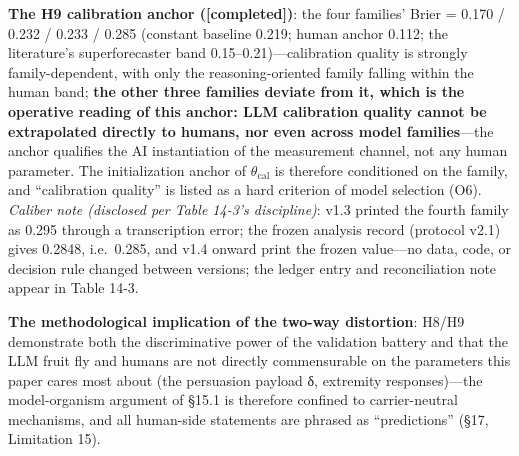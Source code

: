 \documentclass[
  11pt]{article}
\begin{document}
\textbf{The H9 calibration anchor ({[}completed{]})}: the four families'
Brier = 0.170 / 0.232 / 0.233 / 0.285 (constant baseline 0.219; human
anchor 0.112; the literature's superforecaster band
0.15--0.21)---calibration quality is strongly family-dependent, with
only the reasoning-oriented family falling within the human band;
\textbf{the other three families deviate from it, which is the operative
reading of this anchor: LLM calibration quality cannot be extrapolated
directly to humans, nor even across model families}---the anchor
qualifies the AI instantiation of the measurement channel, not any human
parameter. The initialization anchor of \(\theta_{\mathrm{cal}}\) is
therefore conditioned on the family, and ``calibration quality'' is
listed as a hard criterion of model selection (O6). \emph{Caliber note
(disclosed per Table 14-3's discipline)}: v1.3 printed the fourth family
as 0.295 through a transcription error; the frozen analysis record
(protocol v2.1) gives 0.2848, i.e.~0.285, and v1.4 onward print the
frozen value---no data, code, or decision rule changed between versions;
the ledger entry and reconciliation note appear in Table 14-3.

\textbf{The methodological implication of the two-way distortion}: H8/H9
demonstrate both the discriminative power of the validation battery and
that the LLM fruit fly and humans are not directly commensurable on the
parameters this paper cares most about (the persuasion payload δ,
extremity responses)---the model-organism argument of §15.1 is therefore
confined to carrier-neutral mechanisms, and all human-side statements
are phrased as ``predictions'' (§17, Limitation 15).
\end{document}
